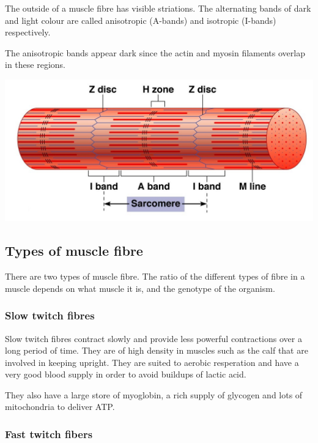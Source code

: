 \documentclass{article}
\begin{document}
The outside of a muscle fibre has visible striations. The alternating bands of
dark and light colour are called anisotropic (A-bands) and isotropic (I-bands)
respectively.

The anisotropic bands appear dark since the actin and myosin filaments overlap
in these regions.

\begin{center}
	\includegraphics[scale=0.65]{muscle_structure}
\end{center}

\subsection*{Types of muscle fibre}

There are two types of muscle fibre. The ratio of the different types of fibre
in a muscle depends on what muscle it is, and the genotype of the organism.

\subsubsection*{Slow twitch fibres}

Slow twitch fibres contract slowly and provide less powerful contractions over a
long period of time. They are of high density in muscles such as the calf that
are involved in keeping upright. They are suited to aerobic resperation and have
a very good blood supply in order to avoid buildups of lactic acid.

They also have a large store of myoglobin, a rich supply of glycogen and lots of
mitochondria to deliver ATP.

\subsubsection*{Fast twitch fibers}
\end{document}
